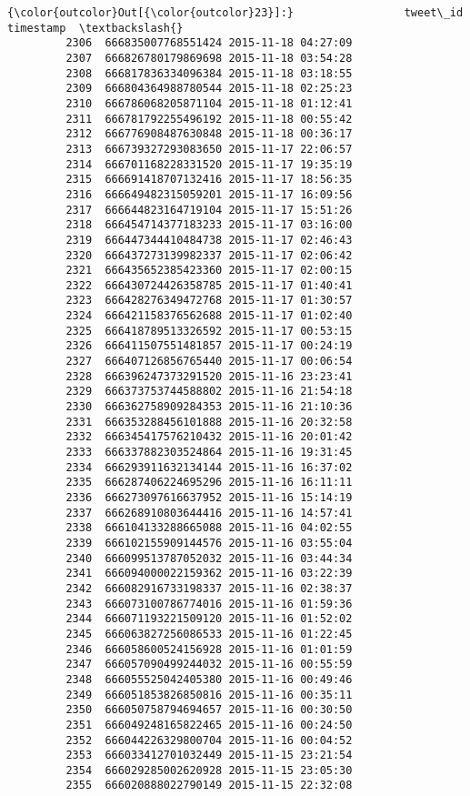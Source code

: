 \documentclass[11pt]{article}
\begin{document}
\begin{Verbatim}[commandchars=\\\{\}]
{\color{outcolor}Out[{\color{outcolor}23}]:}                 tweet\_id           timestamp  \textbackslash{}
         2306  666835007768551424 2015-11-18 04:27:09   
         2307  666826780179869698 2015-11-18 03:54:28   
         2308  666817836334096384 2015-11-18 03:18:55   
         2309  666804364988780544 2015-11-18 02:25:23   
         2310  666786068205871104 2015-11-18 01:12:41   
         2311  666781792255496192 2015-11-18 00:55:42   
         2312  666776908487630848 2015-11-18 00:36:17   
         2313  666739327293083650 2015-11-17 22:06:57   
         2314  666701168228331520 2015-11-17 19:35:19   
         2315  666691418707132416 2015-11-17 18:56:35   
         2316  666649482315059201 2015-11-17 16:09:56   
         2317  666644823164719104 2015-11-17 15:51:26   
         2318  666454714377183233 2015-11-17 03:16:00   
         2319  666447344410484738 2015-11-17 02:46:43   
         2320  666437273139982337 2015-11-17 02:06:42   
         2321  666435652385423360 2015-11-17 02:00:15   
         2322  666430724426358785 2015-11-17 01:40:41   
         2323  666428276349472768 2015-11-17 01:30:57   
         2324  666421158376562688 2015-11-17 01:02:40   
         2325  666418789513326592 2015-11-17 00:53:15   
         2326  666411507551481857 2015-11-17 00:24:19   
         2327  666407126856765440 2015-11-17 00:06:54   
         2328  666396247373291520 2015-11-16 23:23:41   
         2329  666373753744588802 2015-11-16 21:54:18   
         2330  666362758909284353 2015-11-16 21:10:36   
         2331  666353288456101888 2015-11-16 20:32:58   
         2332  666345417576210432 2015-11-16 20:01:42   
         2333  666337882303524864 2015-11-16 19:31:45   
         2334  666293911632134144 2015-11-16 16:37:02   
         2335  666287406224695296 2015-11-16 16:11:11   
         2336  666273097616637952 2015-11-16 15:14:19   
         2337  666268910803644416 2015-11-16 14:57:41   
         2338  666104133288665088 2015-11-16 04:02:55   
         2339  666102155909144576 2015-11-16 03:55:04   
         2340  666099513787052032 2015-11-16 03:44:34   
         2341  666094000022159362 2015-11-16 03:22:39   
         2342  666082916733198337 2015-11-16 02:38:37   
         2343  666073100786774016 2015-11-16 01:59:36   
         2344  666071193221509120 2015-11-16 01:52:02   
         2345  666063827256086533 2015-11-16 01:22:45   
         2346  666058600524156928 2015-11-16 01:01:59   
         2347  666057090499244032 2015-11-16 00:55:59   
         2348  666055525042405380 2015-11-16 00:49:46   
         2349  666051853826850816 2015-11-16 00:35:11   
         2350  666050758794694657 2015-11-16 00:30:50   
         2351  666049248165822465 2015-11-16 00:24:50   
         2352  666044226329800704 2015-11-16 00:04:52   
         2353  666033412701032449 2015-11-15 23:21:54   
         2354  666029285002620928 2015-11-15 23:05:30   
         2355  666020888022790149 2015-11-15 22:32:08   
         

\end{Verbatim}
\end{document}
